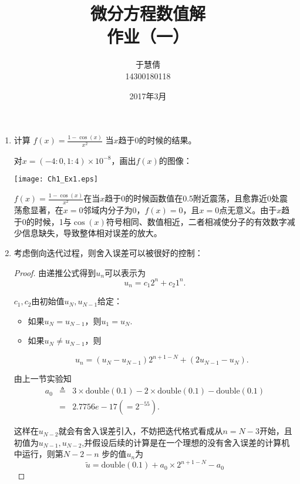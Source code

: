 \documentclass{ctexart}
\title{微分方程数值解 \\ 作业（一）}
\author{于慧倩 \\ 14300180118}
\date{2017年3月}
\begin{document}
\maketitle

\newpage

\begin{enumerate}


\item 计算
\(\displaystyle f(x)=\frac{1-\cos(x)}{x^2}\)
当\(x\)趋于0的时候的结果。

对\(x=(-4:0,1:4)\times10^{-8}\)，画出\(f(x)\)的图像：

\centerline{\texttt{[image: Ch1\_Ex1.eps]}}

\(\displaystyle f(x)=\frac{1-\cos(x)}{x^2}\)在当\(x\)趋于0的时候函数值在0.5附近震荡，且愈靠近0处震荡愈显著，在\(x=0\)邻域内分子为0，\(f(x)=0\)，且\(x=0\)点无意义。由于\(x\)趋于0的时候，1与\(\cos(x)\)符号相同、数值相近，二者相减使分子的有效数字减少信息缺失，导致整体相对误差的放大。


\item 考虑倒向迭代过程，则舍入误差可以被很好的控制：

\begin{proof}

由递推公式得到\(u_n\)可以表示为
\[u_n=c_1 2^n + c_2 1^n. \]

\(c_1 , c_2\)由初始值\(u_N , u_{N-1}\)给定：
\begin{itemize}

\item  如果\(u_N=u_{N-1}\)，则\(u_1=u_N\).

\item 如果\(u_N \neq u_{N-1}\)，则

\[ u_n=(u_N-u_{N-1})2^{n+1-N}+(2u_{N-1}-u_N). \]

\end{itemize}

由上一节实验知
\begin{eqnarray*}
a_0  &\triangleq&  3\times \mbox{double}(0.1) - 2\times \mbox{double}(0.1) - \mbox{double}(0.1) \nonumber \\
      &=&  2.7756e-17(=2^{-55}). \nonumber
\end{eqnarray*}

这样在\(u_{N-2}\)就会有舍入误差引入，不妨把迭代格式看成从\(n=N-3\)开始，且初值为\(u_{N-1},u_{N-2}\),并假设后续的计算是在一个理想的没有舍入误差的计算机中运行，则第\(N-2-n\) 步的值\(u_n\)为
\[ \tilde{u}=\mbox{double}(0.1)+a_0 \times 2^{n+1-N}-a_0\]


\end{proof}
\end{enumerate}
\end{document}
